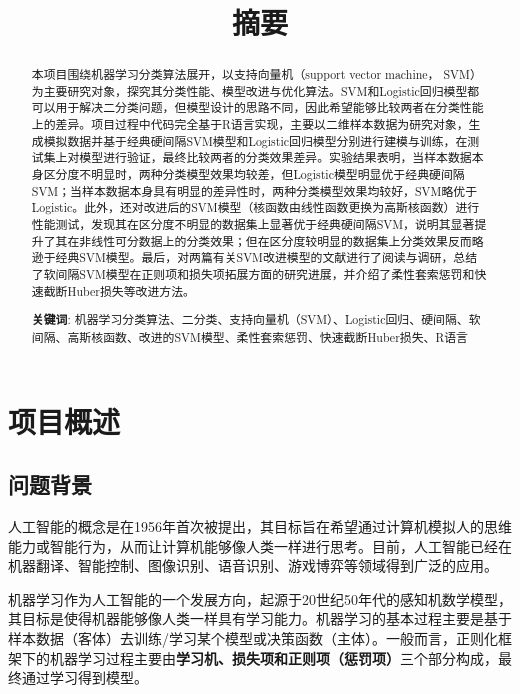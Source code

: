\documentclass[12pt]{article}  %
\title{摘要}
\begin{document}
\begin{abstract}
	\vspace{15pt}
	本项目围绕机器学习分类算法展开，以支持向量机（support vector machine， SVM）为主要研究对象，探究其分类性能、模型改进与优化算法。SVM和Logistic回归模型都可以用于解决二分类问题，但模型设计的思路不同，因此希望能够比较两者在分类性能上的差异。项目过程中代码完全基于R语言实现，主要以二维样本数据为研究对象，生成模拟数据并基于经典硬间隔SVM模型和Logistic回归模型分别进行建模与训练，在测试集上对模型进行验证，最终比较两者的分类效果差异。实验结果表明，当样本数据本身区分度不明显时，两种分类模型效果均较差，但Logistic模型明显优于经典硬间隔SVM；当样本数据本身具有明显的差异性时，两种分类模型效果均较好，SVM略优于Logistic。此外，还对改进后的SVM模型（核函数由线性函数更换为高斯核函数）进行性能测试，发现其在区分度不明显的数据集上显著优于经典硬间隔SVM，说明其显著提升了其在非线性可分数据上的分类效果；但在区分度较明显的数据集上分类效果反而略逊于经典SVM模型。最后，对两篇有关SVM改进模型的文献进行了阅读与调研，总结了软间隔SVM模型在正则项和损失项拓展方面的研究进展，并介绍了柔性套索惩罚和快速截断Huber损失等改进方法。
	\vspace{5pt}
	\noindent
	
	\textbf{关键词}: 机器学习分类算法、二分类、支持向量机（SVM）、Logistic回归、硬间隔、软间隔、高斯核函数、改进的SVM模型、柔性套索惩罚、快速截断Huber损失、R语言
\end{abstract}

\maketitle  

\tableofcontents

\section{项目概述}

\subsection{问题背景}
人工智能的概念是在1956年首次被提出，其目标旨在希望通过计算机模拟人的思维能力或智能行为，从而让计算机能够像人类一样进行思考。目前，人工智能已经在机器翻译、智能控制、图像识别、语音识别、游戏博弈等领域得到广泛的应用。

机器学习作为人工智能的一个发展方向，起源于20世纪50年代的感知机数学模型，其目标是使得机器能够像人类一样具有学习能力。机器学习的基本过程主要是基于样本数据（客体）去训练/学习某个模型或决策函数（主体）。一般而言，正则化框架下的机器学习过程主要由\textbf{学习机、损失项和正则项（惩罚项）}三个部分构成，最终通过学习得到模型。
\end{document}
